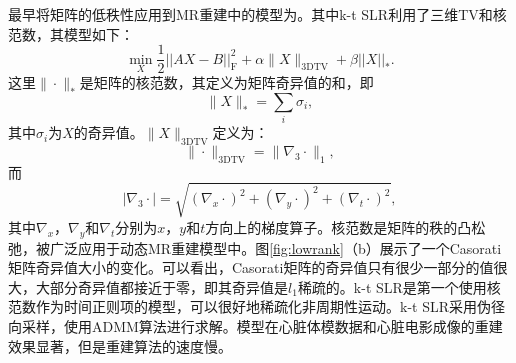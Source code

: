 最早将矩阵的低秩性应用到MR重建中的模型为\cite{zhao2012image,Sajan2011Accelerated}。其中k-t SLR\cite{Sajan2011Accelerated}利用了三维TV和核范数，其模型如下：
\begin{equation}
	\min_X \frac{1}{2}||AX-B||^2_\mathrm{F}+\alpha\|X\|_{\mathrm{3DTV}}+\beta||X||_*.
\end{equation}
这里$\|\cdot\|_*$是矩阵的核范数，其定义为矩阵奇异值的和，即
$$\|X\|_*=\sum_i\sigma_i,$$
其中$\sigma_i$为$X$的奇异值。$\|X\|_{\mathrm{3DTV}}$定义为：
$$\|\cdot\|_\mathrm{3DTV}=\|\nabla_3\cdot\|_1,$$
而
$$|\nabla_3\cdot|=\sqrt{(\nabla_x \cdot)^2 + (\nabla_y \cdot)^2+(\nabla_t \cdot)^2},$$
其中$\nabla_x$，$\nabla_y$和$\nabla_t$分别为$x$，$y$和$t$方向上的梯度算子。核范数是矩阵的秩的凸松弛，被广泛应用于动态MR重建模型中。图\ref{fig:lowrank}（b）展示了一个Casorati矩阵奇异值大小的变化。可以看出，Casorati矩阵的奇异值只有很少一部分的值很大，大部分奇异值都接近于零，即其奇异值是$l_1$稀疏的。k-t SLR是第一个使用核范数作为时间正则项的模型，可以很好地稀疏化非周期性运动。k-t SLR采用伪径向采样，使用ADMM算法进行求解。模型在心脏体模数据和心脏电影成像的重建效果显著，但是重建算法的速度慢。

